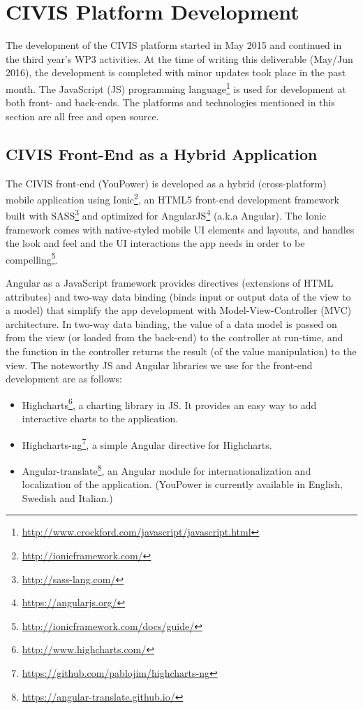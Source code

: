 \section{CIVIS Platform  Development} 
 
The development of the CIVIS platform started in May 2015 \citep{Huang2015c} and continued in the third year's WP3 activities. At the time of writing this deliverable (May/Jun 2016), the development is completed with minor updates took place in the past month.
% 
The JavaScript (JS) programming language\footnote{\url{http://www.crockford.com/javascript/javascript.html}} is used for development at both front- and back-ends. 
The platforms and technologies mentioned in this section are all free and open source. 

\subsection{CIVIS Front-End as a Hybrid Application} 

The CIVIS front-end (YouPower) is developed as a hybrid (cross-platform) mobile application using Ionic\footnote{\url{http://ionicframework.com/}}, an HTML5 front-end development framework built with SASS\footnote{\url{http://sass-lang.com/}} and optimized for AngularJS\footnote{\url{https://angularjs.org/}} (a.k.a Angular). 
% 
The Ionic framework comes with native-styled mobile UI elements and layouts, and handles the look and feel and the UI interactions the app needs in order to be compelling\footnote{\url{http://ionicframework.com/docs/guide/}}. 

Angular as a JavaScript framework provides directives (extensions of HTML attributes) and two-way data binding (binds input or output data of the view to a model) that simplify the app development with Model-View-Controller (MVC) architecture. 
In two-way data binding, the value of a data model is passed on from the view (or loaded from the back-end) to the controller at run-time, and the function in the controller returns the result (of the value manipulation) to the view. 
% 
The noteworthy JS and Angular libraries we use for the front-end development are as follows:
\begin{itemize}
\item
 Highcharts\footnote{\url{http://www.highcharts.com/}}, a charting library in JS. It provides an easy way to add interactive charts to the application. 
\item Highcharts-ng\footnote{\url{https://github.com/pablojim/highcharts-ng}}, a simple Angular directive for Highcharts. 
\item Angular-translate\footnote{\url{https://angular-translate.github.io/}}, an Angular module for internationalization and localization of the application. (YouPower is currently available in English, Swedish and Italian.)

\end{itemize}



